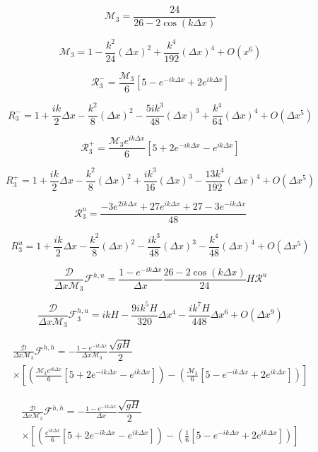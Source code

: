 \documentclass[12pt]{article}
\begin{document}
\[\mathcal{M}_3= \frac{24}{26  -2\cos\left(k\Delta x\right)}\]

\[\mathcal{M}_3= 1 - \frac{k^2}{24} (\Delta x)^2 + \frac{k^4}{192} (\Delta x)^4 + O(x^{6})\]


\[\mathcal{R}_3^-= \frac{\mathcal{M}_3}{6}\left[5  - e^{-ik\Delta x} + 2e^{ik\Delta x} \right]\]

\[R_3^-= 1 + \frac{ik}{2}\Delta x - \frac{k^2}{8} (\Delta x)^2 - \frac{5ik^3}{48} (\Delta x)^3 + \frac{k^4}{64} (\Delta x)^4 + O( \Delta x^5) \]

\[\mathcal{R}_3^+= \frac{\mathcal{M}_3 e^{ik\Delta x }}{6}\left[5 + 2e^{-ik\Delta x} - e^{ik\Delta x} \right]\] 

\[R_3^+= 1 + \frac{ik}{2}\Delta x - \frac{k^2}{8} (\Delta x)^2 + \frac{ik^3}{16} (\Delta x)^3 - \frac{13k^4}{192} (\Delta x)^4 +  O( \Delta x^5)\] 

\[\mathcal{R}^u_3 = \frac{-3e^{2ik\Delta x } + 27e^{ik\Delta x } + 27 - 3e^{-ik\Delta x }}{48}\]

\[R^u_3 = 1 + \frac{ik}{2}\Delta x - \frac{k^2}{8} (\Delta x)^2 - \frac{i k^3}{48} (\Delta x)^3 - \frac{k^4}{48} (\Delta x)^4 +  O( \Delta x^5) \]

\[\frac{\mathcal{D}}{\Delta x\mathcal{M}_3}\mathcal{F}^{h,u} = \frac{1 -e^{-ik\Delta x}}{\Delta x} \frac{26 - 2\cos\left(k \Delta x\right)}{24}H\mathcal{R}^u\]

\[\frac{\mathcal{D}}{\Delta x\mathcal{M}_3}\mathcal{F}_3^{h,u} = ikH - \frac{9i k^5 H}{320} \Delta x^4 - \frac{i k^7 H}{448 } \Delta x ^6 + O(\Delta x ^9) \]

\begin{multline*}
\frac{\mathcal{D}}{\Delta x\mathcal{M}_3} \mathcal{F}^{h,h} = - \frac{1 -e^{-ik\Delta x}}{\Delta x \mathcal{M}_3} \dfrac{ \sqrt{gH}}{ 2}  \\ \times \left [ \left(\frac{\mathcal{M}_3 e^{ik\Delta x }}{6}\left[5 + 2e^{-ik\Delta x} - e^{ik\Delta x} \right]\right)- \left(\frac{\mathcal{M}_3}{6}\left[5  - e^{-ik\Delta x} + 2e^{ik\Delta x} \right]\right) \right ]
\end{multline*}

\begin{multline*}
\frac{\mathcal{D}}{\Delta x\mathcal{M}_3} \mathcal{F}^{h,h} = - \frac{1 -e^{-ik\Delta x}}{\Delta x} \dfrac{ \sqrt{gH}}{ 2}  \\ \times \left [ \left(\frac{e^{ik\Delta x }}{6}\left[5 + 2e^{-ik\Delta x} - e^{ik\Delta x} \right]\right)- \left(\frac{1}{6}\left[5  - e^{-ik\Delta x} + 2e^{ik\Delta x} \right]\right) \right ]
\end{multline*}
\end{document}
